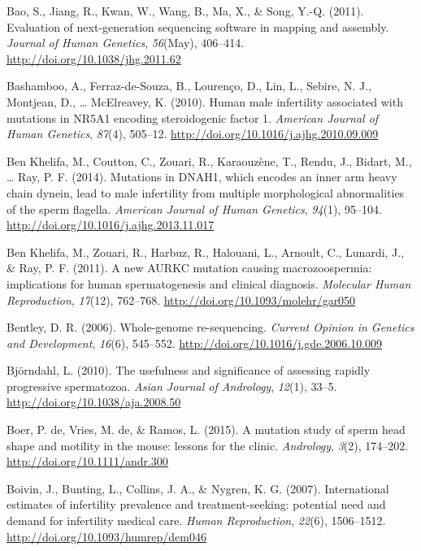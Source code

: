 \documentclass[12pt,twoside]{reedthesis}
\theoremstyle{definition}
\theoremstyle{definition}
\theoremstyle{remark}
\begin{document}
  \hypertarget{ref-Bao2011}{}
  Bao, S., Jiang, R., Kwan, W., Wang, B., Ma, X., \& Song, Y.-Q. (2011).
  Evaluation of next-generation sequencing software in mapping and
  assembly. \emph{Journal of Human Genetics}, \emph{56}(May), 406--414.
  \url{http://doi.org/10.1038/jhg.2011.62}
  
  \hypertarget{ref-Bashamboo2010}{}
  Bashamboo, A., Ferraz-de-Souza, B., Lourenço, D., Lin, L., Sebire, N.
  J., Montjean, D., \ldots{} McElreavey, K. (2010). Human male infertility
  associated with mutations in NR5A1 encoding steroidogenic factor 1.
  \emph{American Journal of Human Genetics}, \emph{87}(4), 505--12.
  \url{http://doi.org/10.1016/j.ajhg.2010.09.009}
  
  \hypertarget{ref-BenKhelifa2014}{}
  Ben Khelifa, M., Coutton, C., Zouari, R., Karaouzène, T., Rendu, J.,
  Bidart, M., \ldots{} Ray, P. F. (2014). Mutations in DNAH1, which
  encodes an inner arm heavy chain dynein, lead to male infertility from
  multiple morphological abnormalities of the sperm flagella.
  \emph{American Journal of Human Genetics}, \emph{94}(1), 95--104.
  \url{http://doi.org/10.1016/j.ajhg.2013.11.017}
  
  \hypertarget{ref-BenKhelifa2011}{}
  Ben Khelifa, M., Zouari, R., Harbuz, R., Halouani, L., Arnoult, C.,
  Lunardi, J., \& Ray, P. F. (2011). A new AURKC mutation causing
  macrozoospermia: implications for human spermatogenesis and clinical
  diagnosis. \emph{Molecular Human Reproduction}, \emph{17}(12), 762--768.
  \url{http://doi.org/10.1093/molehr/gar050}
  
  \hypertarget{ref-Bentley2006}{}
  Bentley, D. R. (2006). Whole-genome re-sequencing. \emph{Current Opinion
  in Genetics and Development}, \emph{16}(6), 545--552.
  \url{http://doi.org/10.1016/j.gde.2006.10.009}
  
  \hypertarget{ref-Bjorndahl2010}{}
  Björndahl, L. (2010). The usefulness and significance of assessing
  rapidly progressive spermatozoa. \emph{Asian Journal of Andrology},
  \emph{12}(1), 33--5. \url{http://doi.org/10.1038/aja.2008.50}
  
  \hypertarget{ref-DeBoer2015}{}
  Boer, P. de, Vries, M. de, \& Ramos, L. (2015). A mutation study of
  sperm head shape and motility in the mouse: lessons for the clinic.
  \emph{Andrology}, \emph{3}(2), 174--202.
  \url{http://doi.org/10.1111/andr.300}
  
  \hypertarget{ref-Boivin2007a}{}
  Boivin, J., Bunting, L., Collins, J. A., \& Nygren, K. G. (2007).
  International estimates of infertility prevalence and treatment-seeking:
  potential need and demand for infertility medical care. \emph{Human
  Reproduction}, \emph{22}(6), 1506--1512.
  \url{http://doi.org/10.1093/humrep/dem046}
  
\end{document}
